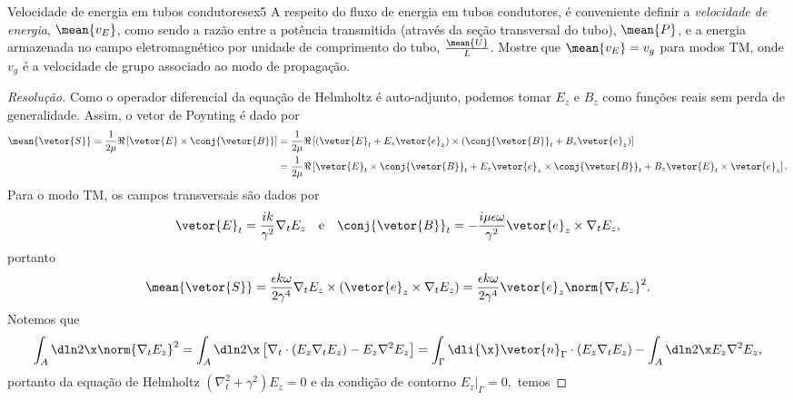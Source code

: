 \begin{exercício}{Velocidade de energia em tubos condutores}{ex5}
    A respeito do fluxo de energia em tubos condutores, é conveniente definir a \emph{velocidade de energia}, \(\mean{v_E}\), como sendo a razão entre a potência transmitida (através da seção transversal do tubo), \(\mean{P}\), e a energia armazenada no campo eletromagnético por unidade de comprimento do tubo, \(\frac{\mean{U}}{L}\). Mostre que \(\mean{v_E} = v_g\) para modos TM, onde \(v_g\) é a velocidade de grupo associado ao modo de propagação.
\end{exercício}
\begin{proof}[Resolução]
    Como o operador diferencial da equação de Helmholtz é auto-adjunto, podemos tomar \(E_z\) e \(B_z\) como funções reais sem perda de generalidade. Assim, o vetor de Poynting é dado por
    \begin{align*}
        \mean{\vetor{S}} = \frac1{2\mu} \Re\left[\vetor{E} \times \conj{\vetor{B}}\right] 
        &= \frac{1}{2\mu} \Re\left[(\vetor{E}_t + E_z \vetor{e}_z) \times (\conj{\vetor{B}}_t + B_z \vetor{e}_z)\right]\\
        &= \frac{1}{2\mu} \Re\left[\vetor{E}_t \times \conj{\vetor{B}}_t + E_z \vetor{e}_z \times \conj{\vetor{B}}_t + B_z\vetor{E}_t\times\vetor{e}_z\right].
    \end{align*}
    Para o modo TM, os campos transversais são dados por
    \begin{equation*}
        \vetor{E}_t = \frac{i k}{\gamma^2} \nabla_t E_z
        \quad\text{e}\quad
        \conj{\vetor{B}}_t = -\frac{i \mu \epsilon \omega}{\gamma^2} \vetor{e}_z \times \nabla_t E_z,
    \end{equation*}
    portanto
    \begin{equation*}
        \mean{\vetor{S}} = \frac{\epsilon k \omega}{2\gamma^4} \nabla_t E_z \times (\vetor{e}_z \times \nabla_t E_z) = \frac{\epsilon k \omega}{2 \gamma^4} \vetor{e}_z \norm{\nabla_t E_z}^2.
    \end{equation*}
    Notemos que
    \begin{equation*}
        \int_A \dln2\x \norm{\nabla_t E_z}^2 = \int_A \dln2\x \left[\nabla_t \cdot (E_z \nabla_t E_z) - E_z \nabla^2 E_z\right] = \int_\Gamma \dli{\x} \vetor{n}_\Gamma \cdot (E_z \nabla_t E_z) - \int_A \dln2\x E_z \nabla^2 E_z,
    \end{equation*}
    portanto da equação de Helmholtz \((\nabla_t^2 + \gamma^2)E_z = 0\) e da condição de contorno \(\left.E_z\right|_\Gamma = 0,\) temos

\end{proof}
